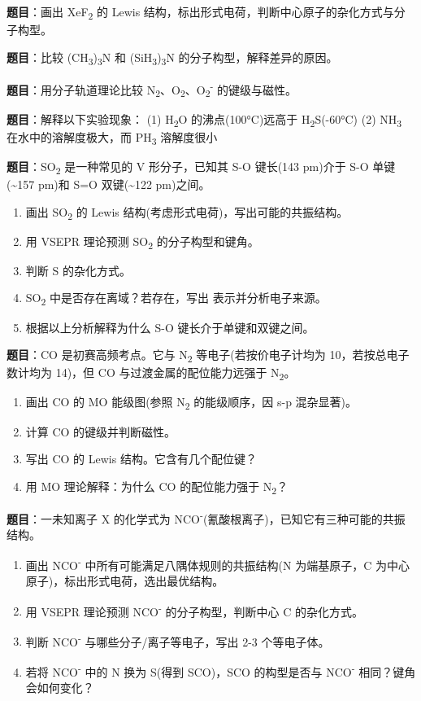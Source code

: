 \textbf{题目}：画出 XeF\textsubscript{2} 的 Lewis 结构，标出形式电荷，判断中心原子的杂化方式与分子构型。

\textbf{题目}：比较 (CH\textsubscript{3})\textsubscript{3}N 和 (SiH\textsubscript{3})\textsubscript{3}N 的分子构型，解释差异的原因。

\textbf{题目}：用分子轨道理论比较 N\textsubscript{2}、O\textsubscript{2}、O\textsubscript{2}\textsuperscript{-} 的键级与磁性。

\textbf{题目}：解释以下实验现象：
(1) H\textsubscript{2}O 的沸点(100°C)远高于 H\textsubscript{2}S(-60°C)
(2) NH\textsubscript{3} 在水中的溶解度极大，而 PH\textsubscript{3} 溶解度很小

\textbf{题目}：SO\textsubscript{2} 是一种常见的 V 形分子，已知其 S-O 键长(143 pm)介于 S-O 单键(\textasciitilde157 pm)和 S=O 双键(\textasciitilde122 pm)之间。

\begin{enumerate}
\def\labelenumi{(\arabic{enumi})}
\tightlist
\item
  画出 SO\textsubscript{2} 的 Lewis 结构(考虑形式电荷)，写出可能的共振结构。
\item
  用 VSEPR 理论预测 SO\textsubscript{2} 的分子构型和键角。
\item
  判断 S 的杂化方式。
\item
  SO\textsubscript{2} 中是否存在离域？若存在，写出  表示并分析电子来源。
\item
  根据以上分析解释为什么 S-O 键长介于单键和双键之间。
\end{enumerate}

\textbf{题目}：CO 是初赛高频考点。它与 N\textsubscript{2} 等电子(若按价电子计均为 10，若按总电子数计均为 14)，但 CO 与过渡金属的配位能力远强于 N\textsubscript{2}。

\begin{enumerate}
\def\labelenumi{(\arabic{enumi})}
\tightlist
\item
  画出 CO 的 MO 能级图(参照 N\textsubscript{2} 的能级顺序，因 s-p 混杂显著)。
\item
  计算 CO 的键级并判断磁性。
\item
  写出 CO 的 Lewis 结构。它含有几个配位键？
\item
  用 MO 理论解释：为什么 CO 的配位能力强于 N\textsubscript{2}？
\end{enumerate}

\textbf{题目}：一未知离子 X 的化学式为 NCO\textsuperscript{-}(氰酸根离子)，已知它有三种可能的共振结构。

\begin{enumerate}
\def\labelenumi{(\arabic{enumi})}
\tightlist
\item
  画出 NCO\textsuperscript{-} 中所有可能满足八隅体规则的共振结构(N 为端基原子，C 为中心原子)，标出形式电荷，选出最优结构。
\item
  用 VSEPR 理论预测 NCO\textsuperscript{-} 的分子构型，判断中心 C 的杂化方式。
\item
  判断 NCO\textsuperscript{-} 与哪些分子/离子等电子，写出 2-3 个等电子体。
\item
  若将 NCO\textsuperscript{-} 中的 N 换为 S(得到 SCO)，SCO 的构型是否与 NCO\textsuperscript{-} 相同？键角会如何变化？
\end{enumerate}

